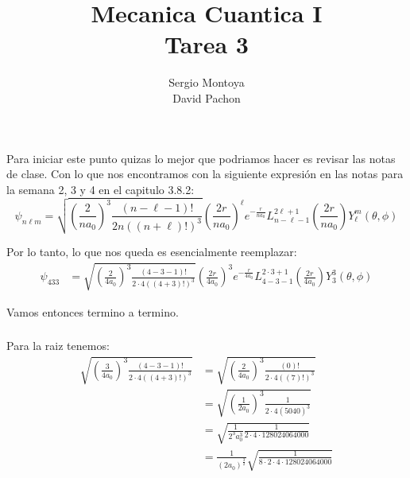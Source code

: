 \documentclass{report}
\title{\Huge{Mecanica Cuantica I}\\Tarea 3}
\author{\huge{Sergio Montoya} \\ \huge{David Pachon}}
\date{}
\begin{document}
\maketitle
\newpage%
\tableofcontents
\pagebreak

\chapter{}

\section{}

Para iniciar este punto quizas lo mejor que podriamos hacer es revisar las notas de clase. Con lo que nos encontramos con la siguiente expresión en las notas para la semana 2, 3 y 4 en el capitulo 3.8.2: \[
	\psi_{n \ell m} = \sqrt{\left( \frac{2}{na_0} \right)^3 \frac{\left( n - \ell - 1 \right)!}{2n \left( \left( n + \ell \right)! \right)^3}} \left( \frac{2r}{n a_0} \right)^{\ell} e^{-\frac{r}{n a_0}} L_{n - \ell - 1}^{2\ell + 1} \left( \frac{2r}{n a_0} \right) Y_{\ell}^{m}\left( \theta, \phi \right)
\]

Por lo tanto, lo que nos queda es esencialmente reemplazar:
\begin{align*}
	\psi_{4 3 3} &= \sqrt{\left( \frac{2}{4a_0} \right)^3 \frac{\left( 4 - 3 - 1 \right)!}{2\cdot4 \left( \left( 4 + 3 \right)! \right)^3}} \left( \frac{2r}{4 a_0} \right)^{3} e^{-\frac{r}{4 a_0}} L_{4 - 3 - 1}^{2\cdot3 + 1} \left( \frac{2r}{4 a_0} \right) Y_{3}^{3}\left( \theta, \phi \right)
\end{align*}

Vamos entonces termino a termino.

\subsection{}

Para la raiz tenemos:
\begin{align*}
	\sqrt{\left( \frac{3}{4a_0} \right)^3 \frac{\left( 4 - 3 - 1 \right)!}{2\cdot4 \left( \left( 4 + 3 \right)! \right)^3}} &= \sqrt{\left( \frac{2}{4a_0} \right)^3 \frac{\left( 0 \right)!}{2\cdot4 \left( \left( 7 \right)! \right)^3}}\\
	&= \sqrt{\left( \frac{1}{2a_0} \right)^3 \frac{1}{2\cdot4 \left( 5040 \right)^3}}\\
	&= \sqrt{\frac{1}{2^3a_0^3} \frac{1}{2\cdot4\cdot128024064000}}\\
	&= \frac{1}{\left( 2 a_0\right)^{\frac{3}{2}}} \sqrt{\frac{1}{8 \cdot 2 \cdot 4 \cdot 128024064000}}
\end{align*}
\end{document}
